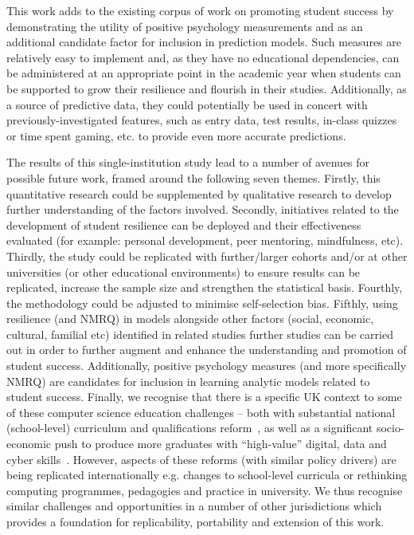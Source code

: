 \documentclass[sigconf]{acmart}
\begin{document}
This work adds to the existing corpus of work on promoting student success by demonstrating the utility of positive psychology measurements and as an additional candidate factor for inclusion in prediction models. Such measures are relatively easy to implement and, as they have no educational dependencies, can be administered at an appropriate point in the academic year when students can be supported to grow their resilience and flourish in their studies. Additionally, as a source of predictive data, they could potentially be used in concert with previously-investigated features, such as entry data, test results, in-class quizzes or time spent gaming, etc. to provide even more accurate predictions. 

The results of this single-institution study lead to a number of avenues for possible future work, framed around the following seven themes. Firstly, this quantitative research could be supplemented by qualitative research to develop further understanding of the factors involved. Secondly, initiatives related to the development of student resilience can be deployed and their effectiveness evaluated (for example: personal development, peer mentoring, mindfulness, etc). Thirdly, the study could be replicated with further/larger cohorts and/or at other universities (or other educational environments) to ensure results can be replicated, increase the sample size and strengthen the statistical basis. Fourthly, the methodology could be adjusted to minimise self-selection bias. Fifthly, using resilience (and NMRQ) in models alongside other factors (social, economic, cultural, familial etc) identified in related studies further studies can be carried out in order to further augment and enhance the understanding and promotion of student success. Additionally, positive psychology measures (and more specifically NMRQ) are candidates for inclusion in learning analytic models related to student success. Finally, we recognise that there is a specific UK context to some of these computer science education challenges -- both with substantial national (school-level) curriculum and qualifications reform~\cite{brown-et-al-toce2014}, as well as a significant socio-economic push to produce more graduates with ``high-value'' digital, data and cyber skills~\cite{crick-et-al:fie2019,crick-et-al-accred:cep2020}. However, aspects of these reforms (with similar policy drivers) are being replicated internationally e.g. changes to school-level curricula or rethinking computing programmes, pedagogies and practice in university. We thus recognise similar challenges and opportunities in a number of other jurisdictions which provides a foundation for replicability, portability and extension of this work.




\appendix
\end{document}
